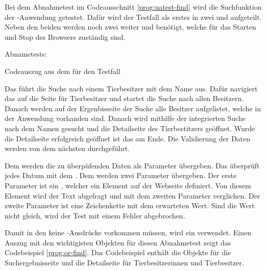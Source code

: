 Bei dem  Abnahmetest im Codeausschnitt \ref{prog:uatest-find} wird die Suchfunktion der -Anwendung getestet. Dafür wird der Testfall als erstes in zwei   und  aufgeteilt. Neben den beiden  werden noch zwei weiter   und   benötigt, welche für das Starten und Stop des Browsers zuständig sind. 

\begin{program}

\caption{Abnametests: }
\label{prog:uatest-find}
\end{program}


\begin{program}

\caption{Codeauszug aus dem  für den Testfall }
\label{prog:or-find}
\end{program}

\SuperPar
Das   führt die Suche nach einem Tierbesitzer mit dem Name  aus. Dafür navigiert das  auf die Seite für Tierbesitzer und startet die Suche nach allen Besitzern. Danach werden auf der Ergenbisseite der Suche alle Besitzer aufgelistet, welche in der Anwendung vorhanden sind. Danach wird mithilfe der integrierten Suche nach dem Namen  gesucht und die Detailseite des Tierbestitzers geöffnet. Wurde die Detailseite erfolgreich geöffnet ist das  am Ende. Die Validierung der Daten werden von dem nächsten   durchgeführt.

\SuperPar
Dem   werden die zu überpüfenden Daten als Parameter übergeben. Das  überprüft jedes Datum mit dem  . Dem  werden zwei Parameter übergeben. Der erste Parameter ist ein , welcher ein Element auf der Webseite definiert. Von diesem Element wird der Text abgefragt und mit dem zweiten Parameter verglichen. Der zweite Parameter ist eine Zeichenkette mit dem erwarteten Wert. Sind die Wert nicht gleich, wird der Test mit einem Fehler abgebrochen. 

\SuperPar
Damit in den  keine -Ausdrücke vorkommen müssen, wird ein  verwendet. Einen Auszug mit den wichtigisten Objekten für diesen Abnahmetest zeigt das Codebeispiel \ref{prog:or-find}. Das Codebeispiel enthält die Objekte für die Suchergebnisseite und die Detailseite für Tierbesitzerinnen und Tierbesitzer.

